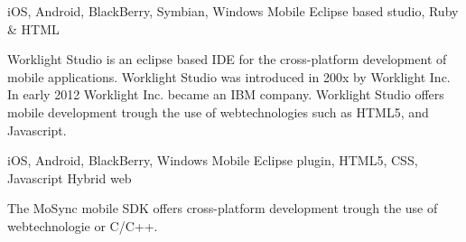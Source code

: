 iOS, Android, BlackBerry, Symbian, Windows Mobile
Eclipse based studio, Ruby \& HTML


Worklight Studio is an eclipse based IDE for the cross-platform development of mobile applications. Worklight Studio was introduced in 200x by Worklight Inc. In early 2012 Worklight Inc. became an IBM company. Worklight Studio offers mobile development trough the use of webtechnologies such as HTML5, and Javascript.

iOS, Android, BlackBerry, Windows Mobile	
Eclipse plugin, HTML5, CSS, Javascript
Hybrid web

The MoSync mobile SDK offers cross-platform development trough the use of webtechnologie or C/C++.


